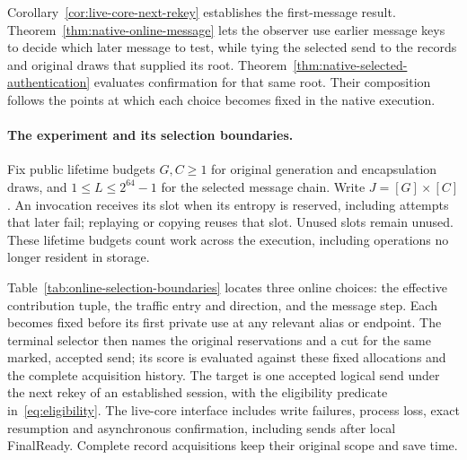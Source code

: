 \documentclass[pdflatex]{sn-jnl}
\theoremstyle{thmstyleone}
\theoremstyle{thmstylethree}
\theoremstyle{thmstyletwo}
\begin{document}
Corollary~\ref{cor:live-core-next-rekey} establishes the first-message
result. Theorem~\ref{thm:native-online-message} lets the observer use earlier
message keys to decide which later message to test, while tying the selected
send to the records and original draws that supplied its root.
Theorem~\ref{thm:native-selected-authentication} evaluates confirmation for
that same root. Their composition follows the points at which each choice
becomes fixed in the native execution.

\paragraph{The experiment and its selection boundaries.}
Fix public lifetime budgets $G,C\geq1$ for original generation and
encapsulation draws, and $1\le L\le2^{64}-1$ for the selected message chain.
Write $J=[G]\times[C]$. An invocation receives its slot when its entropy is
reserved, including attempts that later fail; replaying or copying reuses
that slot. Unused slots remain unused. These lifetime budgets count work
across the execution, including operations no longer resident in storage.

Table~\ref{tab:online-selection-boundaries} locates three online choices:
the effective contribution tuple, the traffic entry and direction, and the
message step. Each becomes fixed before its first private use at any relevant
alias or endpoint. The terminal selector then names the original reservations
and a cut for the same marked, accepted send; its score is evaluated against
these fixed allocations and the complete acquisition history.
The target is one accepted logical send under the next rekey of an established
session, with the eligibility predicate in~\eqref{eq:eligibility}.
The live-core interface includes write failures, process loss, exact resumption
and asynchronous confirmation, including sends after local FinalReady.
Complete record acquisitions keep their original scope and save time.
\end{document}
